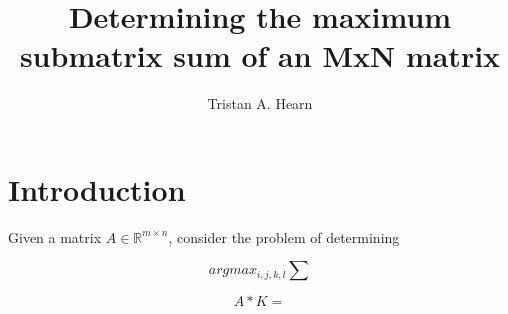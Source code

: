 \documentclass{article}
\begin{document}
\title{Determining the maximum submatrix sum of an MxN matrix}
\author{Tristan A. Hearn}

\maketitle

\section{Introduction}
Given a matrix $A \in \mathbb{R} ^ {m \times n}$, consider the problem of determining

$$
argmax_{i,j,k,l} \sum 
$$

\begin{equation}
    A * K = 
\end{equation}


\end{document}
